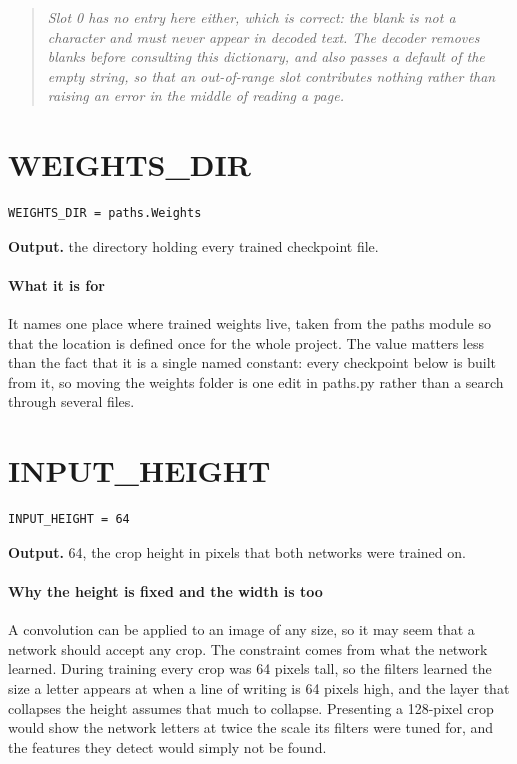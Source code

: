 \begin{quote}\small\itshape Slot 0 has no entry here either, which is correct: the blank is not a character and must never appear in decoded text. The decoder removes blanks before consulting this dictionary, and also passes a default of the empty string, so that an out-of-range slot contributes nothing rather than raising an error in the middle of reading a page.\end{quote}

\section{WEIGHTS\_DIR}
\begin{lstlisting}[style=sig]
WEIGHTS_DIR = paths.Weights
\end{lstlisting}

\noindent\textbf{Output.} the directory holding every trained checkpoint file.


\paragraph{What it is for}
It names one place where trained weights live, taken from the paths module so that the location is defined once for the whole project. The value matters less than the fact that it is a single named constant: every checkpoint below is built from it, so moving the weights folder is one edit in paths.py rather than a search through several files.


\section{INPUT\_HEIGHT}
\begin{lstlisting}[style=sig]
INPUT_HEIGHT = 64
\end{lstlisting}

\noindent\textbf{Output.} 64, the crop height in pixels that both networks were trained on.


\paragraph{Why the height is fixed and the width is too}
A convolution can be applied to an image of any size, so it may seem that a network should accept any crop. The constraint comes from what the network learned. During training every crop was 64 pixels tall, so the filters learned the size a letter appears at when a line of writing is 64 pixels high, and the layer that collapses the height assumes that much to collapse. Presenting a 128-pixel crop would show the network letters at twice the scale its filters were tuned for, and the features they detect would simply not be found.


